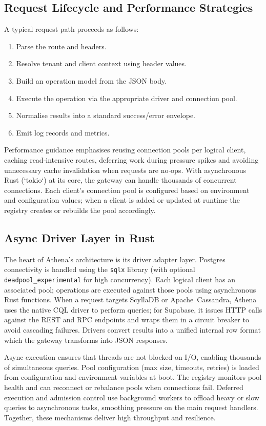 \documentclass[11pt,a4paper]{article}
\begin{document}
\subsection{Request Lifecycle and Performance Strategies}

A typical request path proceeds as follows:
\begin{enumerate}
  \item Parse the route and headers.
  \item Resolve tenant and client context using header values.
  \item Build an operation model from the JSON body.
  \item Execute the operation via the appropriate driver and connection pool.
  \item Normalise results into a standard success/error envelope.
  \item Emit log records and metrics.
\end{enumerate}

Performance guidance emphasises reusing connection pools per logical client, caching read‑intensive routes, deferring work during pressure spikes and avoiding unnecessary cache invalidation when requests are no‑ops.  With asynchronous Rust (`tokio`) at its core, the gateway can handle thousands of concurrent connections.  Each client’s connection pool is configured based on environment and configuration values; when a client is added or updated at runtime the registry creates or rebuilds the pool accordingly.

\subsection{Async Driver Layer in Rust}

The heart of Athena’s architecture is its driver adapter layer.  Postgres connectivity is handled using the \texttt{sqlx} library (with optional \texttt{deadpool\_experimental} for high concurrency).  Each logical client has an associated pool; operations are executed against those pools using asynchronous Rust functions.  When a request targets ScyllaDB or Apache Cassandra, Athena uses the native CQL driver to perform queries; for Supabase, it issues HTTP calls against the REST and RPC endpoints and wraps them in a circuit breaker to avoid cascading failures.  Drivers convert results into a unified internal row format which the gateway transforms into JSON responses.

Async execution ensures that threads are not blocked on I/O, enabling thousands of simultaneous queries.  Pool configuration (max size, timeouts, retries) is loaded from configuration and environment variables at boot.  The registry monitors pool health and can reconnect or rebalance pools when connections fail.  Deferred execution and admission control use background workers to offload heavy or slow queries to asynchronous tasks, smoothing pressure on the main request handlers.  Together, these mechanisms deliver high throughput and resilience.
\end{document}
